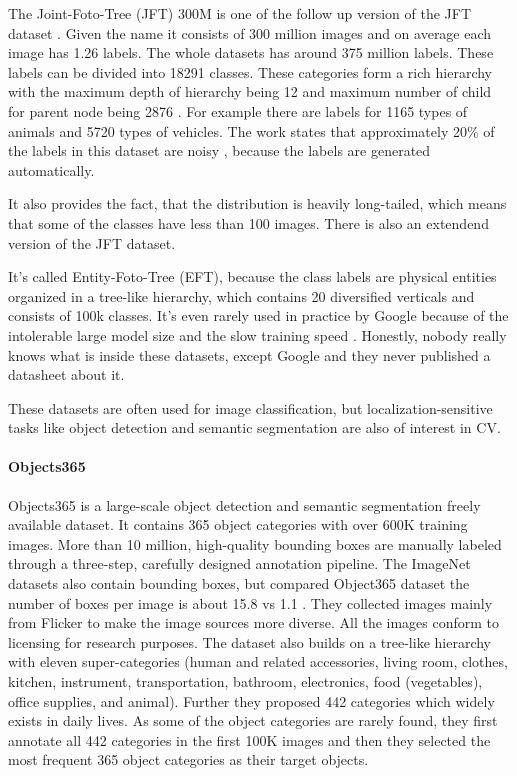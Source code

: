 \documentclass[
]{krantz}
\begin{document}
The Joint-Foto-Tree (JFT) 300M is one of the follow up version of the JFT dataset \citep{hinton2015distilling}. Given the name it consists of 300 million images and on average each image has 1.26 labels. The whole datasets has around 375 million labels. These labels can be divided into 18291 classes. These categories form a rich hierarchy with the maximum depth of hierarchy being 12 and maximum number of child for parent node being 2876 \citep{sun2017revisiting}. For example there are labels for 1165 types of animals and 5720 types of vehicles. The work states that approximately 20\% of the labels in this dataset are noisy \citep{sun2017revisiting}, because the labels are generated automatically.

It also provides the fact, that the distribution is heavily long-tailed, which means that some of the classes have less than 100 images. There is also an extendend version of the JFT dataset.

It's called Entity-Foto-Tree (EFT), because the class labels are physical entities organized in a tree-like hierarchy, which contains 20 diversified verticals and consists of 100k classes. It's even rarely used in practice by Google because of the intolerable large model size and the slow training speed \citep{gao2017knowledge}. Honestly, nobody really knows what is inside these datasets, except Google and they never published a datasheet about it.

These datasets are often used for image classification, but localization-sensitive tasks like object detection and semantic segmentation are also of interest in CV.

\hypertarget{objects365}{%
\paragraph{Objects365}\label{objects365}}

Objects365 \citep{shao2019objects365} is a large-scale object detection and semantic segmentation freely available dataset. It contains 365 object categories with over 600K training images. More than 10 million, high-quality bounding boxes are manually labeled through a three-step, carefully designed annotation pipeline. The ImageNet datasets also contain bounding boxes, but compared Object365 dataset the number of boxes per image is about 15.8 vs 1.1 \citep{deng2009imagenet}. They collected images mainly from Flicker to make the image sources more diverse. All the images conform to licensing for research purposes. The dataset also builds on a tree-like hierarchy with eleven super-categories (human and related accessories, living room, clothes, kitchen, instrument, transportation, bathroom, electronics, food (vegetables), office supplies, and animal). Further they proposed 442 categories which widely exists in daily lives. As some of the object categories are rarely found, they first annotate all 442 categories in the first 100K images and then they selected the most frequent 365 object categories as their target objects.
\end{document}
